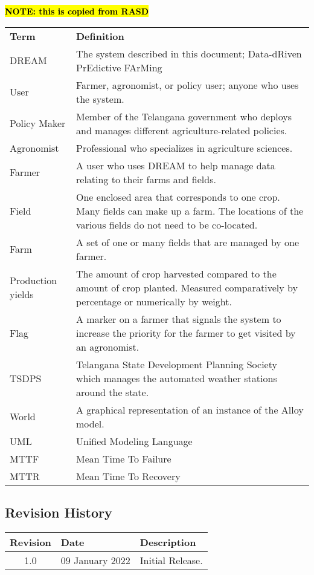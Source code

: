 \hl{\textbf{NOTE: this is copied from RASD}}
\begin{center}
\renewcommand{\arraystretch}{1.25}
\begin{tabular}{l >{\raggedright\arraybackslash}p{12cm} } \hline
    \textbf{Term} & \textbf{Definition}\\ 
    DREAM & The system described in this document; Data-dRiven PrEdictive FArMing\\
    User & Farmer, agronomist, or policy user; anyone who uses the system.\\
	Policy Maker & Member of the Telangana government who deploys and manages different agriculture-related policies. \\
	Agronomist & Professional who specializes in agriculture sciences. \\
    Farmer & A user who uses DREAM to help manage data relating to their farms and fields.\\
    Field & One enclosed area that corresponds to one crop. Many fields can make up a farm. The locations of the various fields do not need to be co-located.\\
    Farm & A set of one or many fields that are managed by one farmer.\\
    Production yields & The amount of crop harvested compared to the amount of crop planted. Measured comparatively by percentage or numerically by weight.\\
    Flag & A marker on a farmer that signals the system to increase the priority for the farmer to get visited by an agronomist.\\
    TSDPS & Telangana State Development Planning Society which manages the automated weather stations around the state. \\
    World & A graphical representation of an instance of the Alloy model.\\
    UML & Unified Modeling Language\\
    MTTF & Mean Time To Failure\\
    MTTR & Mean Time To Recovery\\
    \hline
\end{tabular}
\end{center}



\subsection{Revision History}
\begin{flushleft}
\renewcommand{\arraystretch}{1.25}
\begin{tabular}{|c| l|>{\raggedright\arraybackslash}p{12cm} |} \hline
    \textbf{Revision} & \textbf{Date} & \textbf{Description}\\ \hline 
    1.0 & 09 January 2022 & Initial Release.\\
    \hline
\end{tabular}
\end{flushleft}

